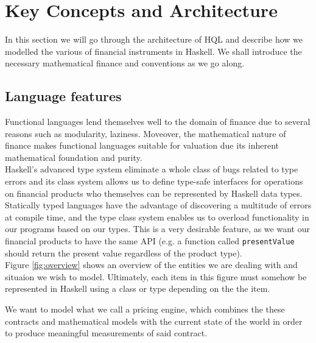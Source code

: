 \chapter{Key Concepts and Architecture}

In this section we will go through the architecture of HQL and describe how we
modelled the various of financial instruments in Haskell. We shall introduce
the necessary mathematical finance and conventions as we go along.

\section{Language features}

Functional languages lend themselves well to the domain of finance due
to several reasons such as modularity\cite{hughes:matters-cj}, 
laziness\cite{composingcontracts}. Moveover, the mathematical
 nature of finance makes functional languages suitable for valuation due its
inherent mathematical foundation and purity.\\

Haskell's advanced type system eliminate a whole class of bugs related to 
type errors and its 
class system allows us to define type-safe interfaces for operations on 
financial products who themselves can be represented by Haskell data types. 
Statically typed languages have the advantage of discovering a multitude of
errors at compile time, and the type class system enables us to overload 
functionality in our programs based on our types. This is a very desirable
feature, as we want our financial products to have the same API (e.g. a function 
called \texttt{presentValue} should return the present value regardless of the
product type).\\

Figure \ref{fig:overview} shows an overview of the entities we are dealing with
and situaion we wish to model. Ultimately, each item in this figure must somehow
be represented in Haskell using a class or type depending on the the item.

We want to model what we call a pricing engine, which combines the 
these contracts and mathematical models with the current state of the world
in order to produce meaningful measurements of said contract.\\

